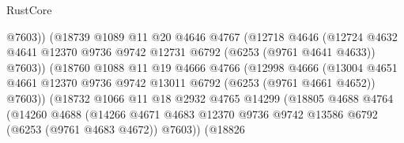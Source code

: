 \begin{lexlean}{RustCore}
\begin{coremodule}
                                  @7603))
                              (@18739
                                @1089
                                @11
                                @20
                                @4646
                                @4767
                                (@12718
                                  @4646
                                  (@12724
                                    @4632
                                    @4641
                                    @12370
                                    @9736
                                    @9742
                                    @12731
                                    @6792
                                    (@6253 (@9761 @4641 @4633))
                                    @7603))
                                (@18760
                                  @1088
                                  @11
                                  @19
                                  @4666
                                  @4766
                                  (@12998
                                    @4666
                                    (@13004
                                      @4651
                                      @4661
                                      @12370
                                      @9736
                                      @9742
                                      @13011
                                      @6792
                                      (@6253 (@9761 @4661 @4652))
                                      @7603))
                                  (@18732
                                    @1066
                                    @11
                                    @18
                                    @2932
                                    @4765
                                    @14299
                                    (@18805
                                      @4688
                                      @4764
                                      (@14260
                                        @4688
                                        (@14266
                                          @4671
                                          @4683
                                          @12370
                                          @9736
                                          @9742
                                          @13586
                                          @6792
                                          (@6253 (@9761 @4683 @4672))
                                          @7603))
                                      (@18826

\end{coremodule}
\end{lexlean}
